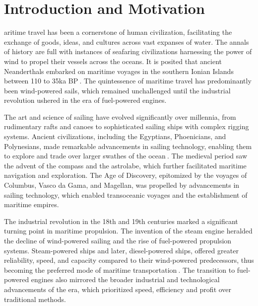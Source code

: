 \let\textcircled=\pgftextcircled
\chapter{Introduction and Motivation}\label{chap:intro}

aritime travel has been a cornerstone of human civilization, facilitating the exchange of goods, ideas, and cultures across vast expanses of water. The annals of history are full with instances of seafaring civilizations harnessing the power of wind to propel their vessels across the oceans. It is posited that ancient Neanderthals embarked on maritime voyages in the southern Ionian Islands between 110 to 35ka BP$~$\cite{Ferentinos2012}. The quintessence of maritime travel has predominantly been wind-powered sails, which remained unchallenged until the industrial revolution ushered in the era of fuel-powered engines.

The art and science of sailing have evolved significantly over millennia, from rudimentary rafts and canoes to sophisticated sailing ships with complex rigging systems. Ancient civilizations, including the Egyptians, Phoenicians, and Polynesians, made remarkable advancements in sailing technology, enabling them to explore and trade over larger swathes of the ocean$~$\cite{casson1995ships}. The medieval period saw the advent of the compass and the astrolabe, which further facilitated maritime navigation and exploration. The Age of Discovery, epitomized by the voyages of Columbus, Vasco da Gama, and Magellan, was propelled by advancements in sailing technology, which enabled transoceanic voyages and the establishment of maritime empires.

The industrial revolution in the 18th and 19th centuries marked a significant turning point in maritime propulsion. The invention of the steam engine heralded the decline of wind-powered sailing and the rise of fuel-powered propulsion systems. Steam-powered ships and later, diesel-powered ships, offered greater reliability, speed, and capacity compared to their wind-powered predecessors, thus becoming the preferred mode of maritime transportation$~$\cite{gardiner1993advent}. The transition to fuel-powered engines also mirrored the broader industrial and technological advancements of the era, which prioritized speed, efficiency and profit over traditional methods.

